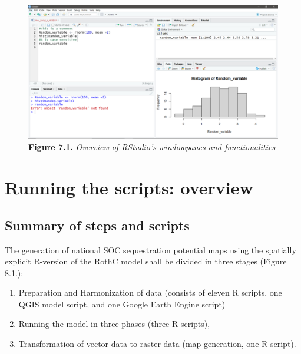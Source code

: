 \documentclass[
  10pt,
  b5paper,
]{book}
\providecommand{\tightlist}{%
  \setlength{\itemsep}{0pt}\setlength{\parskip}{0pt}}
\begin{document}
\begin{figure}
\centering
\includegraphics{images/Figure_7.1.png}
\caption{\textbf{Figure 7.1.} \emph{Overview of RStudio's windowpanes and functionalities}}
\end{figure}

\hypertarget{running-the-scripts-overview}{%
\chapter{\textbar{} Running the scripts: overview}\label{running-the-scripts-overview}}

\hypertarget{summary-of-steps-and-scripts}{%
\section{Summary of steps and scripts}\label{summary-of-steps-and-scripts}}

The generation of national SOC sequestration potential maps using the spatially explicit R-version of the RothC model shall be divided in three stages (Figure 8.1.):

\begin{enumerate}
\def\labelenumi{\arabic{enumi}.}
\tightlist
\item
  Preparation and Harmonization of data (consists of eleven R scripts, one QGIS model script, and one Google Earth Engine script)
\item
  Running the model in three phases (three R scripts),
\item
  Transformation of vector data to raster data (map generation, one R script).
\end{enumerate}
\end{document}
